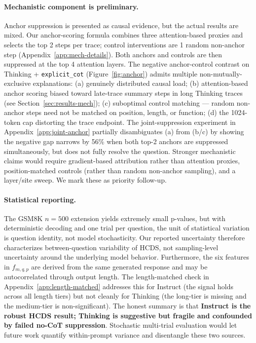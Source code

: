 \documentclass{article}
\theoremstyle{plain}
\theoremstyle{definition}
\theoremstyle{remark}
\begin{document}
\paragraph{Mechanistic component is preliminary.}
Anchor suppression is presented as causal evidence, but the actual results are mixed. Our anchor-scoring formula combines three attention-based proxies and selects the top 2 steps per trace; control interventions are 1 random non-anchor step (Appendix~\ref{app:mech-details}). Both anchors and controls are then suppressed at the top 4 attention layers. The negative anchor-control contrast on Thinking + \texttt{explicit\_cot} (Figure~\ref{fig:anchor}) admits multiple non-mutually-exclusive explanations: (a) genuinely distributed causal load; (b) attention-based anchor scoring biased toward late-trace summary steps in long Thinking traces (see Section~\ref{sec:results-mech}); (c) suboptimal control matching --- random non-anchor steps need not be matched on position, length, or function; (d) the 1024-token cap distorting the trace endpoint. The joint-suppression experiment in Appendix~\ref{app:joint-anchor} partially disambiguates (a) from (b/c) by showing the negative gap narrows by 56\% when both top-2 anchors are suppressed simultaneously, but does not fully resolve the question. Stronger mechanistic claims would require gradient-based attribution rather than attention proxies, position-matched controls (rather than random non-anchor sampling), and a layer/site sweep. We mark these as priority follow-up.

\paragraph{Statistical reporting.}
The GSM8K $n=500$ extension yields extremely small p-values, but with deterministic decoding and one trial per question, the unit of statistical variation is question identity, not model stochasticity. Our reported uncertainty therefore characterizes between-question variability of HCDS, not sampling-level uncertainty around the underlying model behavior. Furthermore, the six features in $f_{m,q,p}$ are derived from the same generated response and may be autocorrelated through output length. The length-matched check in Appendix~\ref{app:length-matched} addresses this for Instruct (the signal holds across all length tiers) but not cleanly for Thinking (the long-tier is missing and the medium-tier is non-significant). The honest summary is that \textbf{Instruct is the robust HCDS result; Thinking is suggestive but fragile and confounded by failed no-CoT suppression}. Stochastic multi-trial evaluation would let future work quantify within-prompt variance and disentangle these two sources.
\end{document}
